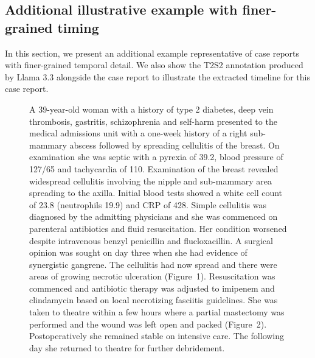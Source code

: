 \documentclass[pmlr,twocolumn,10pt]{jmlr} %
\begin{document}
\subsection{Additional illustrative example with finer-grained timing}

In this section, we present an additional example representative of case reports with finer-grained temporal detail. We also show the T2S2 annotation produced by Llama 3.3 alongside the case report to illustrate the extracted timeline for this case report.

\label{apd:fine_example}
\begin{figure}[!ht]
\centering

\begin{tcolorbox}[annopanel]

\begin{minipage}[t]{0.48\textwidth}
\vspace{0pt} %
\begin{tcolorbox}[
  enhanced,
  colback=blue!3,
  colframe=blue!60!black,
  title=\textbf{PMC3184014},
  fonttitle=\small,
  boxrule=0.8pt,
  arc=2mm,
  left=3mm,right=3mm,top=2mm,bottom=2mm
]
\footnotesize
A 39-year-old woman with a history of type 2 diabetes, deep vein thrombosis, gastritis, schizophrenia and self-harm presented to the medical admissions unit with a one-week history of a right sub-mammary abscess followed by spreading cellulitis of the breast. On examination she was septic with a pyrexia of 39.2, blood pressure of 127/65 and tachycardia of 110. Examination of the breast revealed widespread cellulitis involving the nipple and sub-mammary area spreading to the axilla. Initial blood tests showed a white cell count of 23.8 (neutrophils 19.9) and CRP of 428. Simple cellulitis was diagnosed by the admitting physicians and she was commenced on parenteral antibiotics and fluid resuscitation. Her condition worsened despite intravenous benzyl penicillin and flucloxacillin. A surgical opinion was sought on day three when she had evidence of synergistic gangrene. The cellulitis had now spread and there were areas of growing necrotic ulceration (Figure~1). Resuscitation was commenced and antibiotic therapy was adjusted to imipenem and clindamycin based on local necrotizing fasciitis guidelines. She was taken to theatre within a few hours where a partial mastectomy was performed and the wound was left open and packed (Figure~2). Postoperatively she remained stable on intensive care. The following day she returned to theatre for further debridement.


\end{tcolorbox}
\end{minipage}
\end{tcolorbox}
\end{figure}
\end{document}
